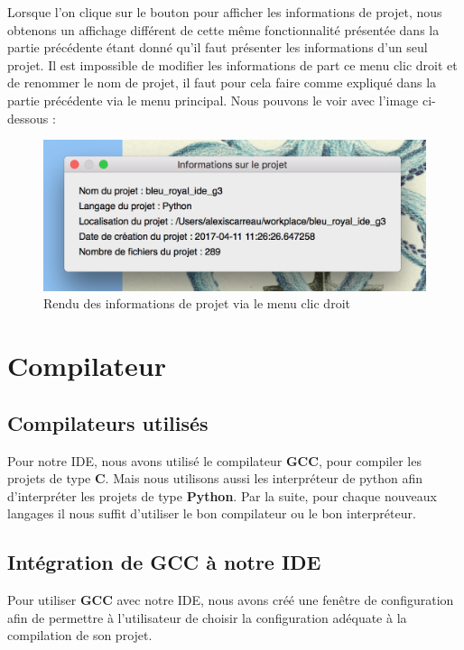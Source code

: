 \documentclass[a4paper,12pt]{article}
\begin{document}
		
Lorsque l'on clique sur le bouton pour afficher les informations de projet, nous obtenons un affichage différent de cette même fonctionnalité présentée dans la partie précédente étant donné qu'il faut présenter les informations d'un seul projet. Il est impossible de modifier les informations de part ce menu clic droit et de renommer le nom de projet, il faut pour cela faire comme expliqué dans la partie précédente via le menu principal. Nous pouvons le voir avec l'image ci-dessous :

 \begin{figure}[h!]
			\begin{center}
				\includegraphics[scale=0.5]{images/imgs_projet/info_project4.png}
				\caption{Rendu des informations de projet via le menu clic droit}
			\end{center}
		\end{figure}


\section{Compilateur}

	\subsection{Compilateurs utilisés}

		Pour notre IDE, nous avons utilisé le compilateur \textbf{GCC}, pour compiler les projets de type \textbf{C}. Mais nous utilisons aussi les interpréteur de python afin d'interpréter les projets de type \textbf{Python}. Par la suite, pour chaque nouveaux langages il nous suffit d'utiliser le bon compilateur ou le bon interpréteur.
		
	\subsection{Intégration de \textbf{GCC} à notre IDE}

		Pour utiliser \textbf{GCC} avec notre IDE, nous avons créé une fenêtre de configuration afin de permettre à l'utilisateur de choisir la configuration adéquate à la compilation de son projet.
\end{document}

